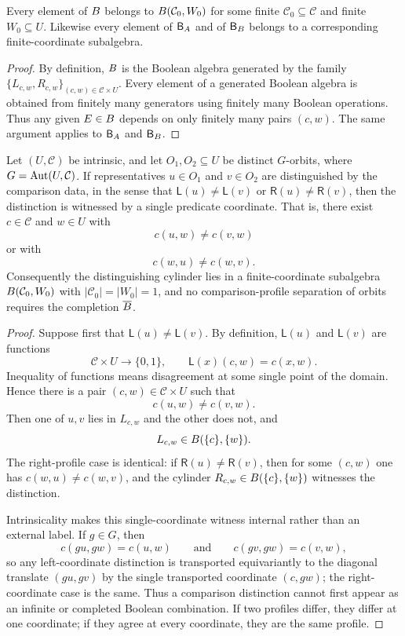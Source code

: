 \begin{lemma}
	\label{lem:finite-support}
	Every element of \(B\) belongs to \(B(\mathcal C_0,W_0)\) for some
	finite \(\mathcal C_0\subseteq\mathcal C\) and finite \(W_0\subseteq U\).
	Likewise every element of \(\mathsf B_A\) and of \(\mathsf B_B\) belongs to a
	corresponding finite-coordinate subalgebra.
\end{lemma}
\begin{proof}
	By definition, \(B\) is the Boolean algebra generated by the family
	\(\{L_{c,w},R_{c,w}\}_{(c,w)\in\mathcal C\times U}\). Every element of
	a generated Boolean algebra is obtained from finitely many generators
	using finitely many Boolean operations. Thus any given \(E\in B\)
	depends on only finitely many pairs \((c,w)\). The same argument applies
	to \(\mathsf B_A\) and \(\mathsf B_B\).
\end{proof}
\begin{lemma}
	\label{lem:orbit-separation-finite-stage}
	Let \((U,\mathcal C)\) be intrinsic, and let
	\(O_1,O_2\subseteq U\) be distinct \(G\)-orbits, where
	\(G=\operatorname{Aut}(U,\mathcal C)\). If representatives \(u\in O_1\) and
	\(v\in O_2\) are distinguished by the comparison data, in the sense that
	\(\mathsf L(u)\neq\mathsf L(v)\) or
	\(\mathsf R(u)\neq\mathsf R(v)\), then the distinction is witnessed by a
	single predicate coordinate. That is, there exist \(c\in\mathcal C\) and
	\(w\in U\) with
	\[
		c(u,w)\neq c(v,w)
	\]
	or with
	\[
		c(w,u)\neq c(w,v).
	\]
	Consequently the distinguishing cylinder lies in a finite-coordinate
	subalgebra \(B(\mathcal C_0,W_0)\) with
	\(|\mathcal C_0|=|W_0|=1\), and no comparison-profile separation of
	orbits requires the completion \(\overline{B}\).
\end{lemma}
\begin{proof}
	Suppose first that \(\mathsf L(u)\neq\mathsf L(v)\). By definition,
	\(\mathsf L(u)\) and \(\mathsf L(v)\) are functions
	\[
		\mathcal C\times U\to\{0,1\},
		\qquad
		\mathsf L(x)(c,w)=c(x,w).
	\]
	Inequality of functions means disagreement at some single point of the
	domain. Hence there is a pair \((c,w)\in\mathcal C\times U\) such that
	\[
		c(u,w)\neq c(v,w).
	\]
	Then one of \(u,v\) lies in \(L_{c,w}\) and the other does not, and
	\[
		L_{c,w}\in B(\{c\},\{w\}).
	\]
	The right-profile case is identical: if \(\mathsf R(u)\neq\mathsf R(v)\),
	then for some \((c,w)\) one has \(c(w,u)\neq c(w,v)\), and the cylinder
	\(R_{c,w}\in B(\{c\},\{w\})\) witnesses the distinction.

	Intrinsicality makes this single-coordinate witness internal rather than
	an external label. If \(g\in G\), then
	\[
		c(gu,gw)=c(u,w)
		\qquad\text{and}\qquad
		c(gv,gw)=c(v,w),
	\]
	so any left-coordinate distinction is transported equivariantly to the
	diagonal translate \((gu,gv)\) by the single transported coordinate
	\((c,gw)\); the right-coordinate case is the same. Thus a comparison
	distinction cannot first appear as an infinite or completed Boolean
	combination. If two profiles differ, they differ at one coordinate; if
	they agree at every coordinate, they are the same profile.
\end{proof}
